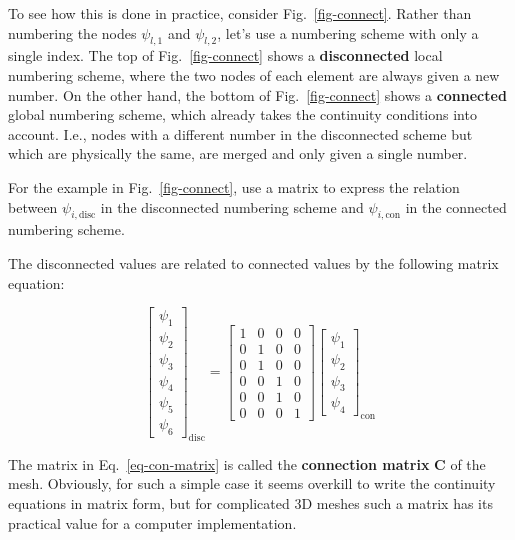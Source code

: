 To see how this is done in practice, consider Fig.~\ref{fig-connect}. Rather than numbering the nodes $\psi_{l,1}$ and $\psi_{l,2}$, let's use a numbering scheme with only a single index. The top of Fig.~\ref{fig-connect} shows a \textbf{disconnected} local numbering scheme, where the two nodes of each element are always given a new number. On the other hand, the bottom of Fig.~\ref{fig-connect} shows a \textbf{connected} global numbering scheme, which already takes the continuity conditions into account. I.e., nodes with a different number in the disconnected scheme but which are physically the same, are merged and only given a single number.

\begin{cue}
For the example in Fig.~\ref{fig-connect}, use a matrix to express the relation between $\psi_{i, \mathrm{disc}}$ in the disconnected numbering scheme and  $\psi_{i, \mathrm{con}}$ in the connected numbering scheme.
\end{cue}
  
The disconnected values are related to connected values by the following matrix equation:

\begin{equation}
\begin{bmatrix}
\psi_1 \\ \psi_2 \\ \psi_3 \\ \psi_4 \\ \psi_5 \\ \psi_6
\end{bmatrix}_{\mathrm{disc}}
=
\begin{bmatrix}
1 & 0 & 0 & 0  \\ 
0 & 1 & 0 & 0  \\   
0 & 1 & 0 & 0  \\ 
0 & 0 & 1 & 0  \\   
0 & 0 & 1 & 0  \\  
0 & 0 & 0 & 1  
\end{bmatrix}
\begin{bmatrix}
\psi_1 \\ \psi_2 \\ \psi_3 \\ \psi_4
\end{bmatrix}_{\mathrm{con}}
\label{eq-con-matrix}
\end{equation} 

The matrix in Eq.~\ref{eq-con-matrix} is called the \textbf{connection matrix} $\mathbf C$ of the mesh. Obviously, for such a simple case it seems overkill to write the continuity equations in matrix form, but for complicated 3D meshes such a matrix has its practical value for a computer implementation.

